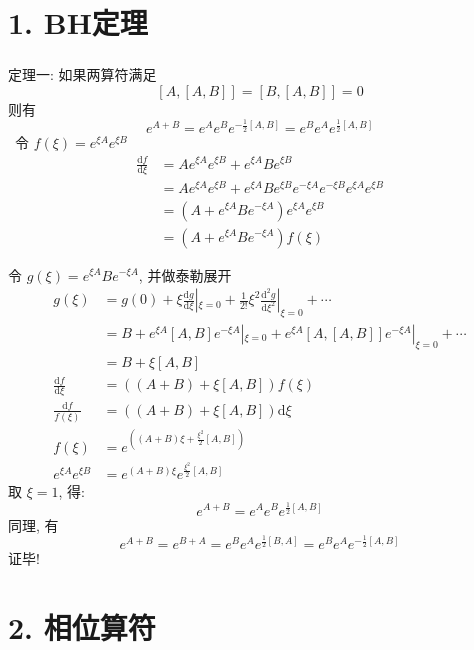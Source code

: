 \section{1. BH定理}

\begin{frame}[allowframebreaks=] 
 \frametitle{}
 定理一: 如果两算符满足
 \[[A,[A,B]] = [B, [A,B]]=0\]
 则有 
 \[e^{A+B}= e^A e^B e^{-\frac{1}{2}[A,B]} =  e^B e^A e^{\frac{1}{2}[A,B]}\]  
 \证~令 $ f(\xi) = e^{\xi A} e^{\xi B}$ 
\[ \begin{aligned}
    \frac{\mathrm{d}f}{\mathrm{d}\xi} &=Ae^{\xi A} e^{\xi B} + e^{\xi A} Be^{\xi B} \\
    &= Ae^{\xi A} e^{\xi B} + e^{\xi A} Be^{\xi B} e^{-\xi A} e^{-\xi B} e^{\xi A} e^{\xi B} \\
    &= (A+e^{\xi A} Be^{-\xi A})e^{\xi A} e^{\xi B} \\ 
    &= (A+e^{\xi A} Be^{-\xi A}) f(\xi)
\end{aligned}\] 
      
令 $g(\xi)= e^{\xi A} Be^{-\xi A}$, 并做泰勒展开
\[\begin{aligned}
        g(\xi) &= g(0)+ \xi \frac{\mathrm{d}g}{\mathrm{d}\xi}|_{\xi=0}+ \frac{1}{2!}\xi^2 \frac{\mathrm{d}^2g}{\mathrm{d}\xi^2}|_{\xi=0}+ \cdots \\ 
        &= B + e^{\xi A}[A,B]e^{-\xi A}|_{\xi=0} + e^{\xi A}[A,[A,B]]e^{-\xi A}|_{\xi=0} + \cdots \\ 
        &= B + \xi[A,B] \\ 
    \frac{\mathrm{d}f}{\mathrm{d}\xi} &= ((A+ B) + \xi[A,B] )f(\xi) \\ 
    \frac{\mathrm{d}f}{f(\xi)} &= ((A+ B) + \xi[A,B] ) \mathrm{d}\xi\\ 
    f(\xi) &=  e^{((A+ B)\xi + \frac{\xi^2}{2} [A,B] )}\\ 
    e^{\xi A} e^{\xi B} &= e^{(A+ B)\xi} e^{\frac{\xi^2}{2} [A,B]}
    \end{aligned} \]
    取 $\xi=1$, 得:
    \[e^{A+B}= e^A e^B e^{\frac{1}{2}[A,B]}\] 
    同理, 有 
    \[e^{A+B} = e^{B+A} = e^B e^A e^{\frac{1}{2}[B,A]} =e^B e^A e^{-\frac{1}{2}[A,B]} \] 
    证毕!
\end{frame}

\section{2. 相位算符}

